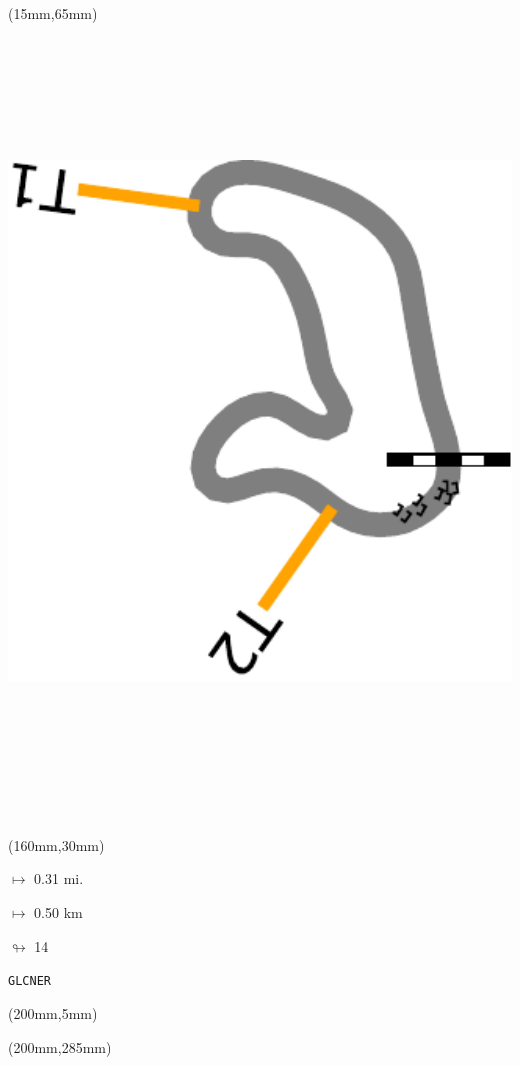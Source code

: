 \begin{textblock*}{185mm}(15mm,65mm)%
\centering
\mbox{\includegraphics[width=185mm,height=210mm,keepaspectratio]{PT/GLCNER.pdf}}
\end{textblock*}
\begin{textblock*}{40mm}(160mm,30mm)%
\Large
\par$\mapsto$ 0.31 mi.
\par$\mapsto$ 0.50 km
\par$\looparrowright$ 14
\par\hfill\tiny\tt GLCNER\\
\end{textblock*}
\begin{textblock*}{20mm}(200mm,5mm)%
\fbox{\thepage}
\label{GLCNER}
\end{textblock*}
\begin{textblock*}{20mm}(200mm,285mm)%
\fbox{\thepage}
\end{textblock*}

